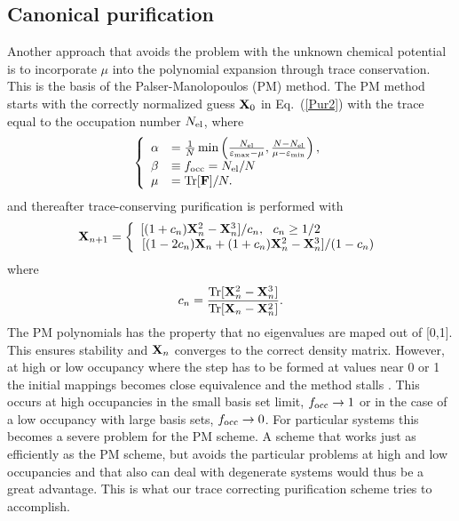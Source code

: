 \commentoutA{\documentclass[prb,aps,twocolumn,twocolumngrid,secnumarabic,superbib,hyperref]{revtex4}}
\begin{document}
\subsection{Canonical purification}

Another approach that avoids the problem with the unknown chemical
potential is to incorporate $\mu$ into the
polynomial expansion through trace conservation. This is the basis 
of the Palser-Manolopoulos\cite{Palser98} (PM) method.
The PM method starts with the correctly normalized guess ${\bf X}_0$ in Eq.\ (\ref{Pur2}) with 
the trace equal to the occupation number $N_{\rm el}$, where
\begin{equation} \left\{
\begin{array}{ll}
\alpha & = \frac{1}{N} \min \left( \frac{N_{\rm el}}{\varepsilon_{\rm max} - \mu},  \frac{N-N_{\rm el}}{\mu-\varepsilon_{\rm min}} \right), \\
\beta &\equiv f_{\rm occ}  = N_{\rm el}/N \\
\mu  &= {\rm Tr}[{\bf F}]/N.
\end{array} \right.
\end{equation}
and thereafter trace-conserving purification is performed with
\begin{equation} 
{\bf X}_{n+1}  = \left\{ 
\begin{array}{l}
[(1+c_n){\bf X}^2_n - {\bf X}^3_n]/c_n,~~ c_n \geq 1/2  \\
\left. [(1-2c_n){\bf X}_n + (1+c_n){\bf X}^2_n - {\bf X}^3_n]/(1-c_n) \right.
\end{array} \right.
\end{equation}
where
\begin{equation}
c_n  = \frac{ {\rm Tr}[{\bf X}^2_n-{\bf X}^3_n] } { {\rm Tr}[{\bf X}_n-{\bf X}^2_n] }.
\end{equation} 
The PM polynomials has the property that no 
eigenvalues are maped out of [0,1].
This ensures stability and ${\bf X}_n$ converges to the correct density matrix.
However, at high or low occupancy
where the step has to be formed at values near 0 or 1 the initial
mappings becomes close equivalence and the method stalls \cite{Palser98,Niklasson02b}. 
This occurs at high occupancies in the small basis set limit, $f_{\rm occ} \rightarrow 1$ 
or in the case of a low occupancy with large basis sets, $f_{\rm occ} \rightarrow 0$. 
For particular systems this becomes a severe problem for the PM scheme.
A scheme that works just as efficiently as the PM scheme, but avoids the particular
problems at high and low occupancies and that also can deal with degenerate systems
would thus be a great advantage. This is what our trace correcting purification scheme
tries to accomplish.
\end{document}
